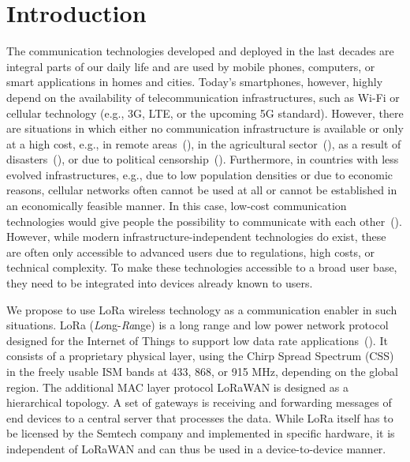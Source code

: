 \section{Introduction}
\label{hoechst2020lora:sec:intro}

The communication technologies developed and deployed in the last decades are integral parts of our daily life and are used by mobile phones, computers, or smart applications in homes and cities.
Today's smartphones, however, highly depend on the availability of telecommunication infrastructures, such as Wi-Fi or cellular technology (e.g., 3G, LTE, or the upcoming 5G standard).
However, there are situations in which either no communication infrastructure is available or only at a high cost, e.g., in remote areas~(\cite{gardner2011serval}), in the agricultural sector~(\cite{elijah2018overview}), as a result of disasters~(\cite{manoj2007communication}), or due to political censorship~(\cite{liu2015performance}).
Furthermore, in countries with less evolved infrastructures, e.g., due to low population densities or due to economic reasons, cellular networks often cannot be used at all or cannot be established in an economically feasible manner. In this case,
low-cost communication technologies would give people the possibility to communicate with each other~(\cite{kayisire2016ict}).
However, while modern infrastructure-independent technologies do exist, these are often only accessible to advanced users due to regulations, high costs, or technical complexity.
To make these technologies accessible to a broad user base, they need to be integrated into devices already known to users.

We propose to use LoRa 
wireless technology as a communication enabler in such situations.
LoRa (\emph{Lo}ng-\emph{Ra}nge) is a
long range and low power network protocol designed for the Internet of Things to support low data rate applications~(\cite{hornbuckle2010fractional}). 
It consists of a proprietary physical layer, using the Chirp Spread Spectrum (CSS) in the freely usable ISM bands at 433, 868, or 915 MHz, depending on the global region.
The additional MAC layer protocol LoRaWAN is designed as a hierarchical topology. 
A set of gateways is receiving and forwarding messages of end devices to a central server that processes the data.
While LoRa itself has to be licensed by the Semtech company and implemented in specific hardware, it is independent of LoRaWAN and can thus be used in a device-to-device manner.

